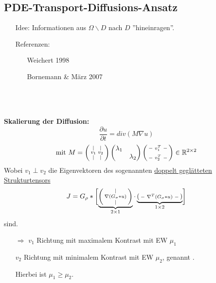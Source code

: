   \subsection{PDE-Transport-Diffusions-Ansatz}
    \begin{minipage}[c]{0.25\linewidth}
      \begin{center}
      \end{center}
    \end{minipage}
    \hfill
    \begin{minipage}[c]{0.65\linewidth}
        \begin{enumerate}
          \item[Idee:] Informationen aus $\Omega \backslash D$ nach $D$ ''hineinragen''.
          \item[Referenzen:] \begin{enumerate}
            \item[\textbullet] Weichert 1998
            \item[\textbullet] Bornemann \& März 2007
          \end{enumerate}
        \end{enumerate}
    \end{minipage}
    \ \\
    \ \\
    \hfill\\
    \textbf{Skalierung der Diffusion:}
    \[\frac{\partial u}{\partial t} = div(M \nabla u)\]
    \[\text{mit } M = \left( \begin{smallmatrix}  | & |\\ v_1 & v_2\\ | & | \end{smallmatrix} \right) \begin{pmatrix} \lambda_1 & \ \\ & \lambda_2 \end{pmatrix} \left( \begin{smallmatrix} - & v_1^T & -\\ \\- & v_2^T & - \end{smallmatrix} \right) \in \mathbb R^{2 \times 2}\]
    Wobei $v_1 \perp v_2$ die Eigenvektoren des sogenannten \underline{doppelt geglätteten Strukturtensors} 
    \[J= G_\rho * \biggl[ \underbrace{\left( \begin{smallmatrix} | \\ \nabla (G_\sigma * u)\\ | \end{smallmatrix} \right)}_{2 \times 1} \cdot \underbrace{\left( \begin{smallmatrix} - & \nabla^T(G_\sigma * u) & - \end{smallmatrix} \right)}_{1 \times 2} \biggr] \]
    sind.\\
    \begin{enumerate}
      \item[$\Rightarrow$] $v_1$ Richtung mit maximalem Kontrast mit EW $\mu_1$
      \item[] $v_2$ Richtung mit minimalem Kontrast mit EW $\mu_2$, genannt .
      \item[] Hierbei ist $\mu_1 \geq \mu_2$.
    \end{enumerate}

